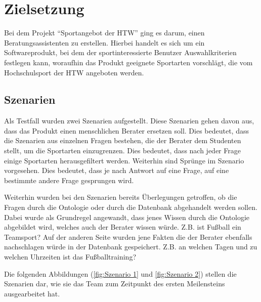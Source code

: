 \chapter{Zielsetzung}
Bei dem Projekt "`Sportangebot der HTW"' ging es darum, einen Beratungsassistenten zu erstellen. Hierbei handelt es sich um ein Softwareprodukt, bei dem der sportinteressierte Benutzer Auswahlkriterien festlegen kann, woraufhin das Produkt geeignete Sportarten vorschlägt, die vom Hochschulsport der HTW angeboten werden.

\section{Szenarien}
Als Testfall wurden zwei Szenarien aufgestellt. Diese Szenarien gehen davon aus, dass das Produkt einen menschlichen Berater ersetzen soll. Dies bedeutet, dass die Szenarien aus einzelnen Fragen bestehen, die der Berater dem Studenten stellt, um die Sportarten einzugrenzen. Dies bedeutet, dass nach jeder Frage einige Sportarten herausgefiltert werden. Weiterhin sind Sprünge im Szenario vorgesehen. Dies bedeutet, dass je nach Antwort auf eine Frage, auf eine bestimmte andere Frage gesprungen wird.

Weiterhin wurden bei den Szenarien bereits Überlegungen getroffen, ob die Fragen durch die Ontologie oder durch die Datenbank abgehandelt werden sollen. Dabei wurde als Grundregel angewandt, dass jenes Wissen durch die Ontologie abgebildet wird, welches auch der Berater wissen würde. Z.B. ist Fußball ein Teamsport? Auf der anderen Seite wurden jene Fakten die der Berater ebenfalls nachschlagen würde in der Datenbank gespeichert. Z.B. an welchen Tagen und zu welchen Uhrzeiten ist das Fußballtraining?

Die folgenden Abbildungen (\ref{fig:Szenario 1} und \ref{fig:Szenario 2}) stellen die Szenarien dar, wie sie das Team zum Zeitpunkt des ersten Meilensteins ausgearbeitet hat.

